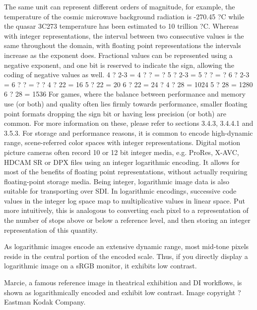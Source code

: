 The same unit can represent different orders of magnitude, for example, the temperature of the cosmic microwave background radiation is -270.45 ?C while the quasar 3C273 temperature has been estimated to 10 trillion ?C. Whereas with integer representations, the interval between two consecutive values is the same throughout the domain, with floating point representations the intervals increase as the exponent does. Fractional values can be represented using a negative exponent, and one bit is reserved to indicate the sign, allowing the coding of negative values as well.
4 ? 2-3 = 4 ? ? = ?
5 ? 2-3 = 5 ? ? = ?
6 ? 2-3 = 6 ? ? = ?
?
4 ? 22 = 16
5 ? 22 = 20
6 ? 22 = 24
?
4 ? 28 = 1024
5 ? 28 = 1280
6 ? 28 = 1536
For games, where the balance between performance and memory use (or both) and quality often lies firmly towards performance, smaller floating point formats dropping the sign bit or having less precision (or both) are common. For more information on these, please refer to sections 3.4.3, 3.4.4.1 and 3.5.3.
For storage and performance reasons, it is common to encode high-dynamic range, scene-referred color spaces with integer representations. Digital motion picture cameras often record 10 or 12 bit integer media, e.g. ProRes, X-AVC, HDCAM SR or DPX files using an integer logarithmic encoding. It allows for most of the benefits of floating point representations, without actually requiring floating-point storage media. Being integer, logarithmic image data is also suitable for transporting over SDI. In logarithmic encodings, successive code values in the integer log space map to multiplicative values in linear space. Put more intuitively, this is analogous to converting each pixel to a representation of the number of stops above or below a reference level, and then storing an integer representation of this quantity.

As logarithmic images encode an extensive dynamic range, most mid-tone pixels reside in the central portion of the encoded scale. Thus, if you directly display a logarithmic image on a sRGB monitor, it exhibits low contrast.

Marcie, a famous reference image in theatrical exhibition and DI workflows, is shown as logarithmically encoded and exhibit low contrast. Image copyright ? Eastman Kodak Company.

